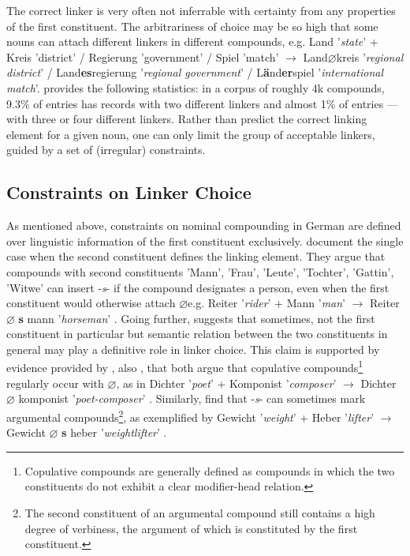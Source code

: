 \documentclass[10pt, a4paper]{article}
\newcommand{\zeroLinker}{\ensuremath{\boldsymbol{\varnothing}}}
\newcommand{\compEx}[7]{%
    #1 '\textit{#2}' + #4 '\textit{#5}'
    $\rightarrow$
    \if\relax\detokenize{#6}\relax
      #1%
    \else
      #6%
    \fi
    \if\relax\detokenize{#3}\relax
      \zeroLinker%
    \else
      \textbf{#3}%
    \fi
    \MakeLowercase{#4} '\textit{#7}'%
}
\begin{document}
The correct linker is very often not inferrable with certainty from any properties of the first constituent. The arbitrariness of choice may be so high that some nouns can attach different linkers in different compounds, e.g. Land '\textit{state}' + Kreis 'district' / Regierung 'government' / Spiel 'match' $\rightarrow$ Land{\zeroLinker}kreis '\textit{regional district}' / Land{\textbf{es}}regierung '\textit{regional government}' / L\textbf{ä}nd{\textbf{er}}spiel '\textit{international match}'. \citet[134]{augst_1975} provides the following statistics: in a corpus of roughly 4k compounds, 9.3\% of entries has records with two different linkers and almost 1\% of entries --- with three or four different linkers. Rather than predict the correct linking element for a given noun, one can only limit the group of acceptable linkers, guided by a set of (irregular) constraints.


\subsection{Constraints on Linker Choice}
\label{sec:constr}

As mentioned above, constraints on nominal compounding in German are defined over linguistic information of the first constituent exclusively. \citet[56]{ortner_mueller-bollhagen_1991} document the single case when the second constituent defines the linking element. They argue that compounds with second constituents 'Mann', 'Frau', 'Leute', 'Tochter', 'Gattin', 'Witwe' can insert -\textit{s}- if the compound designates a person, even when the first constituent would otherwise attach \zeroLinker e.g. \compEx{Reiter}{rider}{s}{Mann}{man}{}{horseman}. Going further, \citet[227]{eisenberg_2013} suggests that sometimes, not the first constituent in particular but semantic relation between the two constituents in general may play a definitive role in linker choice. This claim is supported by evidence provided by \citet{koliopoulou_2014}, also \citet{neef_borgwaldt_2012}, that both argue that copulative compounds\footnote{Copulative compounds are generally defined as compounds in which the two constituents do not exhibit a clear modifier-head relation.} regularly occur with \zeroLinker, as in \compEx{Dichter}{poet}{}{Komponist}{composer}{}{poet-composer}. Similarly, \cite{nuebling_szczepaniak_2013} find that -\textit{s}- can sometimes mark argumental compounds\footnote{The second constituent of an argumental compound still contains a high degree of verbiness, the argument of which is constituted by the first constituent.}, as exemplified by \compEx{Gewicht}{weight}{s}{Heber}{lifter}{}{weightlifter}.
\end{document}
